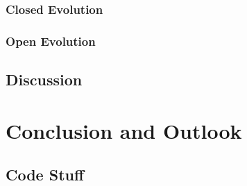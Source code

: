 \documentclass[12pt]{article}
\begin{document}
\subsubsection{Closed Evolution}
\subsubsection{Open Evolution}
\subsection{Discussion}



































\newpage

\section{Conclusion and Outlook}











































\begin{appendices}
    \section{Code Stuff}
\end{appendices}
\newpage

 
 
\end{document}
